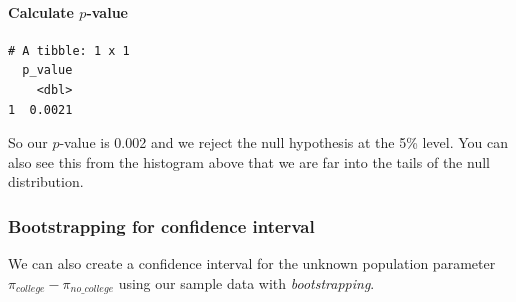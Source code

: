 \documentclass[12pt,]{krantz}
\makeatletter
\newenvironment{Shaded}{\begin{snugshade}}{\end{snugshade}}
\newcommand{\KeywordTok}[1]{\textcolor[rgb]{0.27,0.27,0.27}{\textbf{#1}}}
\newcommand{\DataTypeTok}[1]{\textcolor[rgb]{0.27,0.27,0.27}{#1}}
\newcommand{\DecValTok}[1]{\textcolor[rgb]{0.06,0.06,0.06}{#1}}
\newcommand{\StringTok}[1]{\textcolor[rgb]{0.5,0.5,0.5}{#1}}
\newcommand{\OperatorTok}[1]{\textcolor[rgb]{0.43,0.43,0.43}{\textbf{#1}}}
\newcommand{\NormalTok}[1]{#1}
\let\oldparagraph\paragraph
\renewcommand{\paragraph}[1]{\oldparagraph{#1}\mbox{}}
\newenvironment{kframe}{%
\medskip{}
\setlength{\fboxsep}{.8em}
 \def\at@end@of@kframe{}%
 \ifinner\ifhmode%
  \def\at@end@of@kframe{\end{minipage}}%
  \begin{minipage}{\columnwidth}%
 \fi\fi%
 \def\FrameCommand##1{\hskip\@totalleftmargin \hskip-\fboxsep
 \colorbox{shadecolor}{##1}\hskip-\fboxsep
     \hskip-\linewidth \hskip-\@totalleftmargin \hskip\columnwidth}%
 \MakeFramed {\advance\hsize-\width
   \@totalleftmargin\z@ \linewidth\hsize
   \@setminipage}}%
 {\par\unskip\endMakeFramed%
 \at@end@of@kframe}
\renewenvironment{Shaded}{\begin{kframe}}{\end{kframe}}
\makeatother
\begin{document}
\paragraph{\texorpdfstring{Calculate
\(p\)-value}{Calculate p-value}}\label{calculate-p-value-2}

\begin{Shaded}
\end{Shaded}

\begin{verbatim}
# A tibble: 1 x 1
  p_value
    <dbl>
1  0.0021
\end{verbatim}

So our \(p\)-value is 0.002 and we reject the null hypothesis at the 5\%
level. You can also see this from the histogram above that we are far
into the tails of the null distribution.

\subsubsection*{Bootstrapping for confidence
interval}\label{bootstrapping-for-confidence-interval-2}

We can also create a confidence interval for the unknown population
parameter \(\pi_{college} - \pi_{no\_college}\) using our sample data
with \emph{bootstrapping}.

\begin{Shaded}
\end{Shaded}
\end{document}
